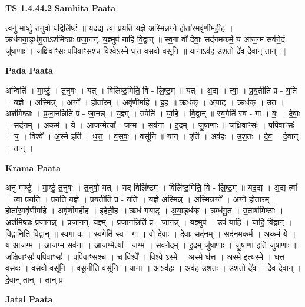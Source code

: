 \documentclass[17pt]{extarticle}
\begin{document}
\textbf{TS 1.4.44.2 } \newline
\textbf{Samhita Paata} \newline

त्वनु॑ मार्ष्टु त॒नुवो॒ यद्विलि॑ष्टं ॥ यद॒द्य त्वा᳚ प्रय॒ति य॒ज्ञे अ॒स्मिन्नग्ने॒ होता॑र॒मवृ॑णीमही॒ह । ऋध॑गया॒डृध॑गु॒ताऽश॑मिष्ठाः प्रजा॒नन्. य॒ज्ञ्मुप॑ याहि वि॒द्वान् ॥ स्व॒गा वो॑ देवाः॒ सद॑नमकर्म॒ य आ॑ज॒ग्म सव॑ने॒दं जु॑षा॒णाः । ज॒क्षि॒वाꣳसः॑ पपि॒वाꣳस॑श्च॒ विश्वे॒ऽस्मे ध॑त्त वसवो॒ वसू॑नि ॥ यानाऽव॑ह उश॒तो दे॑व दे॒वान् तान्-[ ] \newline

\textbf{Pada Paata} \newline

अन्विति॑ । मा॒र्ष्टु॒ । त॒नुवः॑ । यत् । विलि॑ष्ट॒मिति॒ वि - लि॒ष्ट॒म् ॥ यत् । अ॒द्य । त्वा॒ । प्र॒य॒तीति॑ प्र - य॒ति । य॒ज्ञे । अ॒स्मिन्न् । अग्ने᳚ । होता॑रम् । अवृ॑णीमहि । इ॒ह ॥ ऋध॑क् । अ॒या॒ट् । ऋध॑क् । उ॒त । अश॑मिष्ठाः । प्र॒जा॒नन्निति॑ प्र - जा॒नन्न् । य॒ज्ञ्म् । उपेति॑ । या॒हि॒ । वि॒द्वान् ॥ स्व॒गेति॑ स्व - गा । वः॒ । दे॒वाः॒ । सद॑नम् । अ॒क॒र्म॒ । ये । आ॒ज॒ग्मेत्या᳚ - ज॒ग्म । सव॑ना । इ॒दम् । जु॒षा॒णाः ॥ ज॒क्षि॒वाꣳसः॑ । प॒पि॒वाꣳसः॑ । च॒ । विश्वे᳚ । अ॒स्मे इति॑ । ध॒त्त॒ । व॒स॒वः॒ । वसू॑नि ॥ यान् । एति॑ । अव॑हः । उ॒श॒तः । दे॒व॒ । दे॒वान् । तान् ।  \newline


\textbf{Krama Paata} \newline

अनु॑ मार्ष्टु । मा॒र्ष्टु॒ त॒नुवः॑ । त॒नुवो॒ यत् । यद् विलि॑ष्टम् । विलि॑ष्ट॒मिति॒ वि - लि॒ष्ट॒म् ॥ यद॒द्य । अ॒द्य त्वा᳚ । त्वा॒ प्र॒य॒ति । प्र॒य॒ति य॒ज्ञे । प्र॒य॒तीति॑ प्र - य॒ति । य॒ज्ञे अ॒स्मिन्न् । अ॒स्मिन्नग्ने᳚ । अग्ने॒ होता॑रम् । होता॑र॒मवृ॑णीमहि । अवृ॑णीमही॒ह । इ॒हेती॒ह ॥ ऋध॑ गयाट् । अ॒या॒डृध॑क् । ऋध॑गु॒त । उ॒ताश॑मिष्ठाः । अश॑मिष्ठाः प्रजा॒नन्न् । प्र॒जा॒नन्. य॒ज्ञ्म् । प्र॒जा॒नन्निति॑ प्र - जा॒नन्न् । य॒ज्ञ्मुप॑ । उप॑ याहि । या॒हि॒ वि॒द्वान् । वि॒द्वानिति॑ वि॒द्वान् ॥ स्व॒गा वः॑ । स्व॒गेति॑ स्व - गा । वो॒ दे॒वाः॒ । दे॒वाः॒ सद॑नम् । सद॑नमकर्म । अ॒क॒र्म॒ ये । य आ॑ज॒ग्म । आ॒ज॒ग्म सव॑ना । आ॒ज॒ग्मेत्या᳚ - ज॒ग्म । सव॑ने॒दम् । इ॒दम् जु॑षा॒णाः । जु॒षा॒णा इति॑ जुषा॒णाः ॥ ज॒क्षि॒वाꣳसः॑ पपि॒वाꣳसः॑ । प॒पि॒वाꣳस॑श्च । च॒ विश्वे᳚ । विश्वे॒ ऽस्मे । अ॒स्मे ध॑त्त । अ॒स्मे इत्य॒स्मे । ध॒त्त॒ व॒स॒वः॒ । व॒स॒वो॒ वसू॑नि । वसू॒नीति॒ वसू॑नि ॥ याना । आऽव॑हः । अव॑ह उश॒तः । उ॒श॒तो दे॑व । दे॒व॒ दे॒वान् । दे॒वान् तान् । तान् प्र \newline

\textbf{Jatai Paata} \newline
\end{document}
